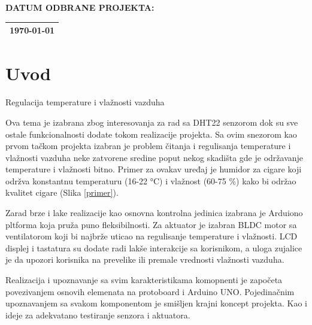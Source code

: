\documentclass[a4paper, 12pt]{article}
\begin{document}
\begin{titlepage}
\begin{table}[H]
\vspace{0.5cm}

\textbf{DATUM ODBRANE PROJEKTA:}\\[7pt]
\begin{tabular}{|p{16cm}|}
\hline
\setlength\parindent{10pt}
\today \\
\hline
\end{tabular}
\end{table}
\end{titlepage}

\tableofcontents
\pagebreak

\begingroup
\justifying

\section{Uvod}

\vspace{10pt}

Regulacija temperature i vlažnosti vazduha

\vspace{10pt}

Ova tema je izabrana zbog interesovanja za rad sa DHT22 senzorom dok su sve ostale funkcionalnosti dodate tokom realizacije projekta. Sa ovim snezorom kao prvom tačkom projekta izabran je problem čitanja i regulisanja temperature i vlažnosti vazduha neke zatvorene sredine poput nekog skadišta gde je održavanje temperature i vlažnosti bitno. Primer za ovakav uređaj je humidor za cigare koji održva konstantnu temperaturu (16-22 °C) i vlažnost (60-75 \%) kako bi održao kvalitet cigare (Slika \ref{primer}).

\vspace{10pt}

  Zarad brze i lake realizacije kao osnovna kontrolna jedinica izabrana je Arduiono pltforma koja pruža puno fleksibilnosti. Za aktuator je izabran BLDC motor sa ventilatorom koji bi najbrže uticao na regulisanje temperature i vlažnosti. LCD displej i tastatura su dodate radi lakše interakcije sa korisnikom, a uloga zujalice je da upozori korisnika na prevelike ili premale vrednosti vlažnosti vazduha. 

\vspace{10pt}


Realizacija i upoznavanje sa svim karakteristikama komopnenti je započeta povezivanjem osnovih elemenata na protoboard i Arduino UNO. Pojedinačnim upoznavanjem sa svakom komponentom je smišljen krajni koncept projekta. Kao i ideje za adekvatano testiranje senzora i aktuatora. 
\end{document}
